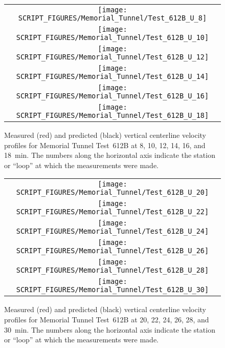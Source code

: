 \begin{figure}[p]
\begin{tabular*}{\textwidth}{c}
\texttt{[image: SCRIPT\_FIGURES/Memorial\_Tunnel/Test\_612B\_U\_8]} \\
\texttt{[image: SCRIPT\_FIGURES/Memorial\_Tunnel/Test\_612B\_U\_10]} \\
\texttt{[image: SCRIPT\_FIGURES/Memorial\_Tunnel/Test\_612B\_U\_12]} \\
\texttt{[image: SCRIPT\_FIGURES/Memorial\_Tunnel/Test\_612B\_U\_14]} \\
\texttt{[image: SCRIPT\_FIGURES/Memorial\_Tunnel/Test\_612B\_U\_16]} \\
\texttt{[image: SCRIPT\_FIGURES/Memorial\_Tunnel/Test\_612B\_U\_18]}
\end{tabular*}
\caption[Memorial Tunnel experiments, velocity profiles, Test 612B, 8-18 min]{Measured (red) and predicted (black) vertical centerline velocity profiles for Memorial Tunnel Test~612B at 8, 10, 12, 14, 16, and 18~min. The numbers along the horizontal axis indicate the station or ``loop'' at which the measurements were made.}
\label{Memorial_612B_U_8-18}
\end{figure}

\begin{figure}[p]
\begin{tabular*}{\textwidth}{c}
\texttt{[image: SCRIPT\_FIGURES/Memorial\_Tunnel/Test\_612B\_U\_20]} \\
\texttt{[image: SCRIPT\_FIGURES/Memorial\_Tunnel/Test\_612B\_U\_22]} \\
\texttt{[image: SCRIPT\_FIGURES/Memorial\_Tunnel/Test\_612B\_U\_24]} \\
\texttt{[image: SCRIPT\_FIGURES/Memorial\_Tunnel/Test\_612B\_U\_26]} \\
\texttt{[image: SCRIPT\_FIGURES/Memorial\_Tunnel/Test\_612B\_U\_28]} \\
\texttt{[image: SCRIPT\_FIGURES/Memorial\_Tunnel/Test\_612B\_U\_30]}
\end{tabular*}
\caption[Memorial Tunnel experiments, velocity profiles, Test 612B, 20-30 min]{Measured (red) and predicted (black) vertical centerline velocity profiles for Memorial Tunnel Test~612B at 20, 22, 24, 26, 28, and 30~min. The numbers along the horizontal axis indicate the station or ``loop'' at which the measurements were made.}
\label{Memorial_612B_U_20-30}
\end{figure}


